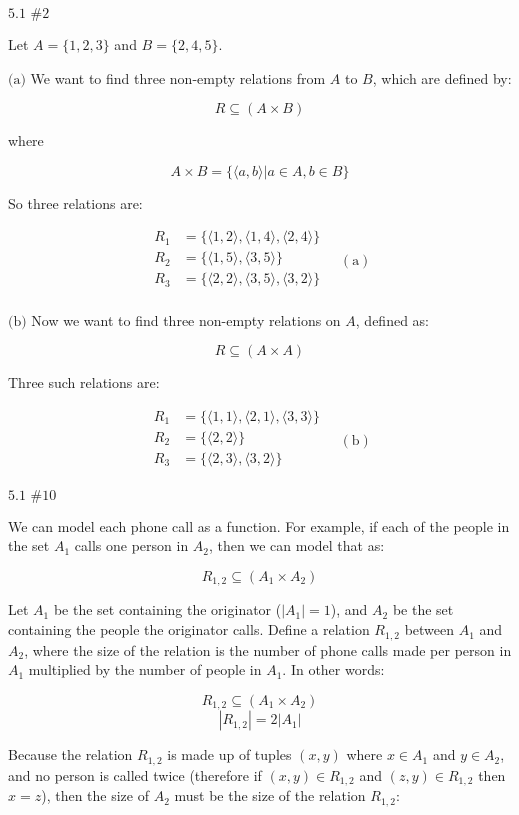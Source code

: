 \documentclass{article}
\newcommand{\problem}[2]{$\boxed{\text{#1 \##2}}$}
\newcommand{\subproblem}[1]{$\boxed{\text{(#1)}}$}
\newcommand{\subsolution}[2]{\boxed{#2\quad(\text{#1})}}
\newcommand{\multistep}[1]{\begin{array}{rl} #1 \end{array}}
\begin{document}
%
\problem{5.1}{2}

Let $A=\{1,2,3\}$ and $B=\{2,4,5\}$.

%
\subproblem{a} We want to find three non-empty relations from $A$ to
$B$, which are defined by:

\[
R\subseteq (A\times B)
\]

where

\[
A\times B=\{\langle a,b\rangle|a\in A,b\in B\}
\]

So three relations are:

\[
\subsolution{a}{
\multistep{
R_1&=\{\langle 1,2\rangle, \langle 1,4\rangle, \langle 2,4\rangle\} \\
R_2&=\{\langle 1,5\rangle, \langle 3,5\rangle\} \\
R_3&=\{\langle 2,2\rangle, \langle 3,5\rangle,\langle 3,2\rangle\} \\
}
}
\]

%
\subproblem{b} Now we want to find three non-empty relations on $A$,
defined as:

\[
R\subseteq (A\times A)
\]

Three such relations are:

\[
\subsolution{b}{\multistep{
R_1&=\{\langle 1,1\rangle, \langle 2,1\rangle, \langle 3,3\rangle\} \\
R_2&=\{\langle 2,2\rangle\} \\
R_3&=\{\langle 2,3\rangle, \langle 3,2\rangle\} \\
}}
\]

%
\problem{5.1}{10}

We can model each phone call as a function. For example, if each of
the people in the set $A_1$ calls one person in $A_2$, then we can
model that as:

\[
R_{1,2}\subseteq(A_1\times A_2)
\]

Let $A_1$ be the set containing the originator ($|A_1|=1$), and $A_2$
be the set containing the people the originator calls. Define a
relation $R_{1,2}$ between $A_1$ and $A_2$, where the size of the
relation is the number of phone calls made per person in $A_1$
multiplied by the number of people in $A_1$. In other words:

\[
R_{1,2}\subseteq(A_1\times A_2)
\] \[
|R_{1,2}|=2|A_1|
\]

Because the relation $R_{1,2}$ is made up of tuples $(x,y)$ where
$x\in{}A_1$ and $y\in{}A_2$, and no person is called twice (therefore
if $(x,y)\in{}R_{1,2}$ and $(z,y)\in{}R_{1,2}$ then $x=z$), then the
size of $A_2$ must be the size of the relation $R_{1,2}$:
\end{document}

